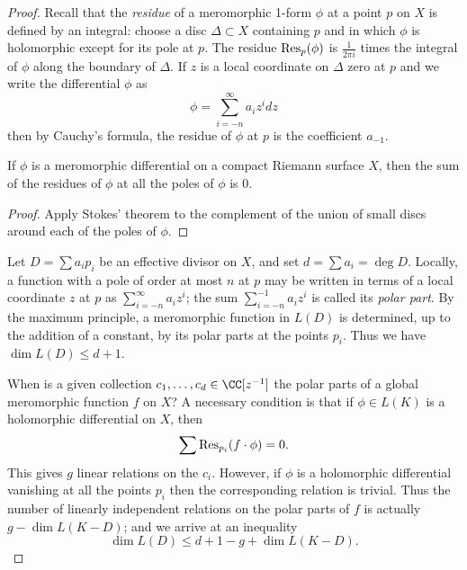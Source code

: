 \begin{proof}
%
Recall that the \emph{residue} of a meromorphic 1-form $\phi$ at a point $p$ on $X$ is defined by an integral: choose a disc $\Delta \subset X$ containing $p$ and in which $\phi$ is holomorphic except for its pole at $p$. The residue ${\rm Res}_p(\phi)$ is $\frac{1}{2\pi i}$ times the integral of $\phi$ along the boundary of $\Delta$. If $z$ is a local coordinate on $\Delta$ zero at $p$ and we write the differential $\phi$ as
$$
\phi = \sum_{i=-n}^\infty a_iz^i dz
$$
then by Cauchy's formula, the residue of $\phi$ at $p$ is the coefficient $a_{-1}$. 

\begin{proposition}\label{residue sum}
 If $\phi$ is a meromorphic differential on a compact Riemann surface $X$, then the sum of the residues of $\phi$
 at all the poles of $\phi$ is 0.
 \end{proposition}
 
\begin{proof}
Apply Stokes' theorem to the complement of the union of small discs around each of the poles of $\phi$.
\end{proof}

Let  $D = \sum a_ip_i$ be an effective divisor on $X$, and set $d = \sum a_i = \deg D$. Locally, a function with a pole of order at most $n$ at $p$ may be written in terms of a local coordinate $z$ at $p$ as $\sum_{i=-n}^\infty a_{i}z^{i} $;
the sum $\sum_{i=-n}^{-1} a_{i}z^{i}$ is called its \emph{polar part}.
By the maximum principle, a meromorphic function in $L(D)$ is determined, up to the addition of a constant, by its polar parts at the points $p_i$. Thus we have $\dim L(D) \leq d+1$.

When is a given collection $c_1,\dots,c_d \in \CC[z^{-1}]$ the polar parts of a global meromorphic function $f$ on $X$? A necessary condition
is that if $\phi \in L(K)$ is a holomorphic differential on $X$, then
$$
\sum {\rm Res}_{p_i}(f \cdot \phi) = 0.
$$
This gives $g$ linear relations on the $c_i$. However, if $\phi$ is a holomorphic differential vanishing at all the points $p_i$
then the corresponding relation is trivial. Thus the number of linearly independent relations on the polar parts of $f$ is actually $g - \dim L(K-D)$; and we arrive at an inequality
$$
\dim L(D) \leq d + 1 - g + \dim L(K-D).
$$


\end{proof}
